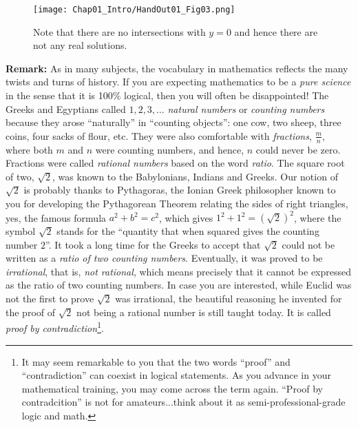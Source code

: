     
\begin{figure}[hbt!]
\centering
\texttt{[image: Chap01\_Intro/HandOut01\_Fig03.png]}
\caption[]{Note that there are no intersections with $y=0$ and hence there are not any real solutions.}
\end{figure}


\newpage

\noindent \textbf{Remark:} As in many subjects, the vocabulary in mathematics reflects the many twists and turns of history. If you are expecting mathematics to be a \textit{pure science} in the sense that it is 100\% logical, then you will often be disappointed! The Greeks and Egyptians called $1, 2, 3, \ldots$ \textit{natural numbers} or \textit{counting numbers} because they arose ``naturally'' in ``counting objects'': one cow, two sheep, three coins, four sacks of flour, etc. They were also comfortable with \textit{fractions},  $\frac{m}{n}$, where both $m$ and $n$ were counting numbers, and hence, $n$ could never be zero. Fractions were called \textit{rational numbers} based on the word \textit{ratio}.
The square root of two, $\sqrt{2}$, was known to the Babylonians, Indians and Greeks.
Our notion of $\sqrt{2}$ is probably thanks to Pythagoras, the Ionian Greek philosopher known to you for developing the Pythagorean Theorem relating the sides of right triangles, yes, the famous formula $a^2+b^2=c^2$, which gives $1^2 + 1^2 = (\sqrt{2})^2$, where the symbol $\sqrt{2}$ stands for the ``quantity that when squared gives the counting number $2$''. It took a long time for the Greeks to accept that $\sqrt{2}$ could not be written as a \textit{ratio of two counting numbers}. Eventually, it was proved to be \textit{irrational}, that is, \textit{not rational}, which means precisely that it cannot be expressed as the ratio of two counting numbers. In case you are interested, while Euclid was not the first to prove $\sqrt{2}$ was irrational, the beautiful reasoning he invented for the proof of $\sqrt{2}$ not being a rational number is still taught today. It is called \textit{proof by contradiction}\footnote{It may seem remarkable to you that the two words ``proof'' and ``contradiction'' can coexist in logical statements. As you advance in your mathematical training, you may come across the term again. ``Proof by contradcition'' is not for amateurs...think about it as semi-professional-grade logic and math.}. \\

